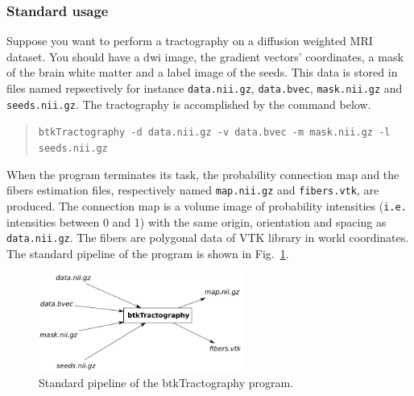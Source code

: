     \subsubsection*{Standard usage}
        Suppose you want to perform a tractography on a diffusion weighted MRI dataset. You should have a dwi image, the gradient vectors' coordinates, a mask of the brain white matter and a label image of the seeds. This data is stored in files named repsectively for instance \texttt{data.nii.gz}, \texttt{data.bvec}, \texttt{mask.nii.gz} and \texttt{seeds.nii.gz}. The tractography is accomplished by the command below.
            \begin{quote}
                \texttt{btkTractography -d data.nii.gz -v data.bvec -m mask.nii.gz -l seeds.nii.gz}
            \end{quote}
        When the program terminates its task, the probability connection map and the fibers estimation files, respectively named \texttt{map.nii.gz} and \texttt{fibers.vtk}, are produced. The connection map is a volume image of probability intensities (\texttt{i.e.} intensities between 0 and 1) with the same origin, orientation and spacing as \texttt{data.nii.gz}. The fibers are polygonal data of VTK library in world coordinates. The standard pipeline of the program is shown in Fig.~\ref{btkTractography-fig:standard-pipeline}.
            \begin{figure}
                \centering
                \includegraphics[width=0.6\textwidth]{btkTractographyPipeline}
                \caption{Standard pipeline of the btkTractography program.}
                \label{btkTractography-fig:standard-pipeline}
            \end{figure}

